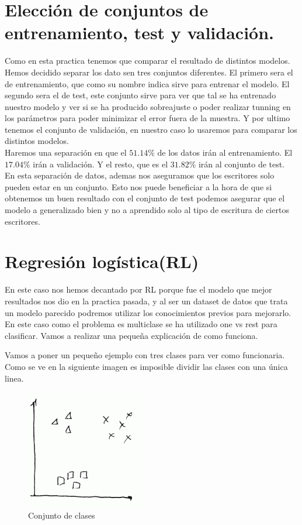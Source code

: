 \documentclass[12pt,a4paper]{article}
\begin{document}
\section{Elección de conjuntos de entrenamiento, test y validación.}

Como en esta practica tenemos que comparar el resultado de distintos modelos. Hemos decidido separar los dato sen tres conjuntos diferentes. El primero sera el de entrenamiento, que como su nombre indica sirve para entrenar el modelo. El segundo sera el de test, este conjunto sirve para ver que tal se ha entrenado nuestro modelo y ver si se ha producido sobreajuste o poder realizar tunning en los parámetros para poder minimizar el error fuera de la muestra. Y por ultimo tenemos el conjunto de validación, en nuestro caso lo usaremos para comparar los distintos modelos. 
\\Haremos una separación en que el  $51.14\%$ de los datos irán al entrenamiento.  El $17.04\%$ irán a validación. Y el resto, que es el $31.82\%$ irán al conjunto de test.\\En esta separación de datos, ademas nos aseguramos que los escritores solo pueden estar en un conjunto. Esto nos puede beneficiar a la hora de que si obtenemos un buen resultado con el conjunto de test podemos asegurar que el modelo a generalizado bien y no a aprendido solo al tipo de escritura de ciertos escritores.


\section{Regresión logística(RL)}	
En este caso nos hemos decantado por RL porque fue el modelo que mejor resultados nos dio en la practica pasada, y al ser un dataset de datos que trata un modelo parecido podremos utilizar los conocimientos previos para mejorarlo. En este caso como el problema es multiclase se ha utilizado one vs rest para clasificar. Vamos a realizar una pequeña explicación de como funciona.

Vamos a poner un pequeño ejemplo con tres clases para ver como funcionaria. Como se ve en la siguiente imagen es imposible dividir las clases con una única linea. 
\begin{figure}[H]
	\centering
	\includegraphics[width=0.7\linewidth]{../imagenesRL/screenshot002}
	\caption{Conjunto de clases}
	\label{fig:screenshot002}
\end{figure}
\end{document}
